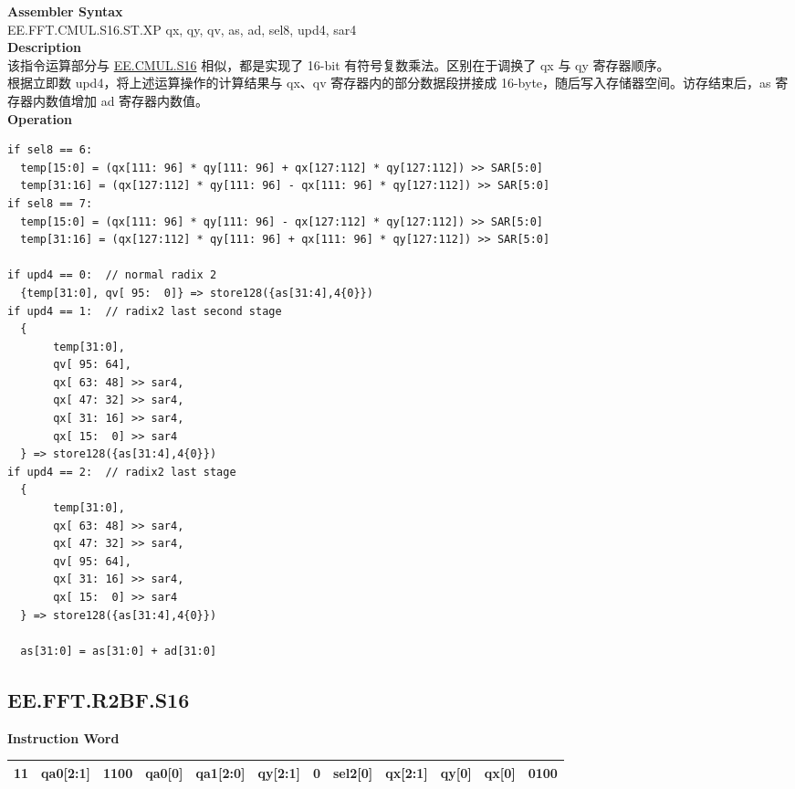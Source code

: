 \textbf{Assembler Syntax} \\
EE.FFT.CMUL.S16.ST.XP qx, qy, qv, as, ad, sel8, upd4, sar4 \\
\textbf{Description} \\
该指令运算部分与 \hyperref[instruction:EECMULS16]{EE.CMUL.S16} 相似，都是实现了 16-bit 有符号复数乘法。区别在于调换了 qx 与 qy 寄存器顺序。\\
根据立即数 upd4，将上述运算操作的计算结果与 qx、qv 寄存器内的部分数据段拼接成 16-byte，随后写入存储器空间。访存结束后，as 寄存器内数值增加 ad 寄存器内数值。\\
\textbf{Operation}
\begin{lstlisting}
if sel8 == 6:
  temp[15:0] = (qx[111: 96] * qy[111: 96] + qx[127:112] * qy[127:112]) >> SAR[5:0]
  temp[31:16] = (qx[127:112] * qy[111: 96] - qx[111: 96] * qy[127:112]) >> SAR[5:0]
if sel8 == 7:
  temp[15:0] = (qx[111: 96] * qy[111: 96] - qx[127:112] * qy[127:112]) >> SAR[5:0]
  temp[31:16] = (qx[127:112] * qy[111: 96] + qx[111: 96] * qy[127:112]) >> SAR[5:0]

if upd4 == 0:  // normal radix 2
  {temp[31:0], qv[ 95:  0]} => store128({as[31:4],4{0}})
if upd4 == 1:  // radix2 last second stage
  {
       temp[31:0],
       qv[ 95: 64],
       qx[ 63: 48] >> sar4,
       qx[ 47: 32] >> sar4,
       qx[ 31: 16] >> sar4,
       qx[ 15:  0] >> sar4
  } => store128({as[31:4],4{0}})
if upd4 == 2:  // radix2 last stage
  {
       temp[31:0],
       qx[ 63: 48] >> sar4,
       qx[ 47: 32] >> sar4,
       qv[ 95: 64],
       qx[ 31: 16] >> sar4,
       qx[ 15:  0] >> sar4
  } => store128({as[31:4],4{0}})

  as[31:0] = as[31:0] + ad[31:0]
\end{lstlisting}



\clearpage
\subsection{EE.FFT.R2BF.S16}\label{instruction:EEFFTR2BFS16}
\setlength\tabcolsep{6pt}
\textbf{Instruction Word} \\
\begin{tabular}{|c|c|c|c|c|c|c|c|c|c|c|c|}
	\hline
	11 & qa0[2:1] & 1100 & qa0[0] & qa1[2:0] & qy[2:1] & 0 & sel2[0] & qx[2:1] & qy[0] & qx[0] & 0100 \\
	\hline
\end{tabular}

